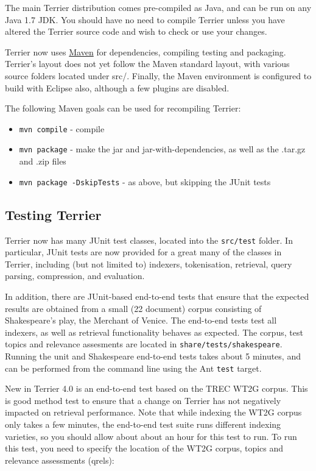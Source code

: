 The main Terrier distribution comes pre-compiled as Java, and can be run
on any Java 1.7 JDK. You should have no need to compile Terrier unless
you have altered the Terrier source code and wish to check or use your
changes.

Terrier now uses \href{https://maven.apache.org}{Maven} for
dependencies, compiling testing and packaging. Terrier's layout does not
yet follow the Maven standard layout, with various source folders
located under src/. Finally, the Maven environment is configured to
build with Eclipse also, although a few plugins are disabled.

The following Maven goals can be used for recompiling Terrier:

\begin{itemize}
\tightlist
\item
  \texttt{mvn\ compile} - compile
\item
  \texttt{mvn\ package} - make the jar and jar-with-dependencies, as
  well as the .tar.gz and .zip files
\item
  \texttt{mvn\ package\ -DskipTests} - as above, but skipping the JUnit
  tests
\end{itemize}

\subsection{Testing Terrier}\label{testing-terrier}

Terrier now has many JUnit test classes, located into the
\texttt{src/test} folder. In particular, JUnit tests are now provided
for a great many of the classes in Terrier, including (but not limited
to) indexers, tokenisation, retrieval, query parsing, compression, and
evaluation.

In addition, there are JUnit-based end-to-end tests that ensure that the
expected results are obtained from a small (22 document) corpus
consisting of Shakespeare's play, the Merchant of Venice. The end-to-end
tests test all indexers, as well as retrieval functionality behaves as
expected. The corpus, test topics and relevance assesments are located
in \texttt{share/tests/shakespeare}. Running the unit and Shakespeare
end-to-end tests takes about 5 minutes, and can be performed from the
command line using the Ant \texttt{test} target.

\protect\hyperlink{wt2g}{}

New in Terrier 4.0 is an end-to-end test based on the TREC WT2G corpus.
This is good method test to ensure that a change on Terrier has not
negatively impacted on retrieval performance. Note that while indexing
the WT2G corpus only takes a few minutes, the end-to-end test suite runs
different indexing varieties, so you should allow about about an hour
for this test to run. To run this test, you need to specify the location
of the WT2G corpus, topics and relevance assessments (qrels):

